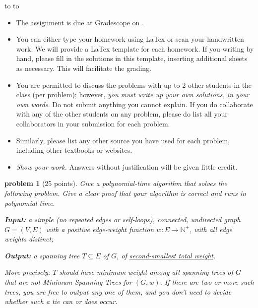 \documentclass[10pt]{article}
\newcommand{\handout}{
   \renewcommand{\thepage}{H\hnumber-\arabic{page}}
   \noindent
   \begin{center}
      \vbox{
    \hbox to \columnwidth {\sc{\course} --- \prof \hfill}
    \vspace{-2mm}
    \hbox to \columnwidth {\sc due \MakeLowercase{\duedate} \duelocation\hfill {\Huge\color{mdb}H\hnumber.\yourname}}
      }
   \end{center}
   \vspace*{2mm}
}
\newtheorem{problem}{\sc\color{cit}problem}
\begin{document}
\handout
\begin{itemize}
\item The assignment is due at Gradescope on \duedate.

\item You can either type your homework using LaTex or scan your handwritten work. We will provide a LaTex template for each homework. If you writing by hand, please fill in the solutions in this template, inserting additional sheets as necessary. This will facilitate the grading.

\item You are permitted to discuss the problems with up to 2 other students in the class (per problem); however, {\em you must write up your own solutions, in your own words}. Do not submit anything you cannot explain. If you do collaborate with any of the other students on any problem, please do list all your collaborators in your submission for each problem. 

\item Similarly, please list any other source you have used for each problem, including other textbooks or websites.


\item {\em Show your work.} Answers without justification will be given little credit.
\end{itemize}


\newpage
\begin{problem}[25 points]
 Give a polynomial-time algorithm that solves the following problem.  Give a clear proof that your algorithm is correct and runs in polynomial time.  

\vspace{1 em}

\textbf{Input:} a simple (no repeated edges or self-loops), connected, undirected graph $G = (V, E)$ with a positive edge-weight function $w: E \rightarrow \mathbb{N}^+$, with all edge weights distinct;

\vspace{1 em}

\textbf{Output:} a spanning tree $T \subseteq E$ of $G$, of \underline{second-smallest total weight}.

\vspace{1 em}

More precisely: $T$ should have minimum weight among all spanning trees of $G$ that are \emph{not} Minimum Spanning Trees for $(G, w)$.  If there are two or more such trees, you are free to output any one of them, and you don't need to decide whether such a tie can or does occur.
 
 
 
 \end{problem}
\end{document}
